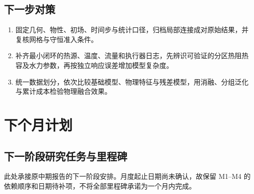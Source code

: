 \documentclass[stage2,UTF8,fontset=fandol]{ydzjreport}
\begin{document}
\subsection{下一步对策}
\begin{enumerate}
\item 固定几何、物性、初场、时间步与统计口径，归档局部连接成对原始结果，并复核网格与守恒准入条件。
\item 补齐最小闭环的热源、温度、流量和执行器日志，先辨识可验证的分区热阻热容及水力参数，再按独立响应误差增加模型复杂度。
\item 统一数据划分，依次比较基础模型、物理特征与残差模型，用消融、分组泛化与累计成本检验物理融合效果。
\end{enumerate}

\section{下个月计划}

\label{ch:plan}
\subsection{下一阶段研究任务与里程碑}
此处承接原中期报告的下一阶段安排。月度起止日期尚未确认，故保留 M1--M4 的依赖顺序和日期待补项，不将全部里程碑承诺为一个月内完成。
\end{document}
